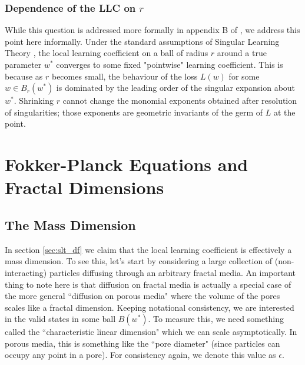 \documentclass{article} %
\theoremstyle{definition}
\begin{document}
\subsubsection{Dependence of the LLC on $r$}
While this question is addressed more formally in appendix B of \citep{lau2024locallearningcoefficientsingularityaware}, we address this point here informally. Under the standard assumptions of Singular Learning Theory \citep{Watanabe2009AlgebraicGA}, the local learning coefficient on a ball of radius $r$ around a true parameter $w^*$ converges to some fixed "pointwise" learning coefficient. This is because as $r$ becomes small, the behaviour of the loss $L(w)$ for some $w \in B_r(w^*)$ is dominated by the leading order of the singular expansion about $w^*$. Shrinking $r$ cannot change the monomial exponents obtained after resolution of singularities; those exponents are geometric invariants of the germ of $L$ at the point.


\section{Fokker-Planck Equations and Fractal Dimensions}
\subsection{The Mass Dimension}\label{app:mass_dim}
In section \ref{sec:slt_df} we claim that the local learning coefficient is effectively a mass dimension. To see this, let's start by considering a large collection of (non-interacting) particles diffusing through an arbitrary fractal media. An important thing to note here is that diffusion on fractal media is actually a special case of the more general ``diffusion on porous media" where the volume of the pores scales like a fractal dimension. Keeping notational consistency, we are interested in the valid states in some ball $B(w^*)$. To measure this, we need something called the ``characteristic linear dimension" which we can scale asymptotically. In porous media, this is something like the ``pore diameter" (since particles can occupy any point in a pore). For consistency again, we denote this value as $\epsilon$. %
\end{document}
